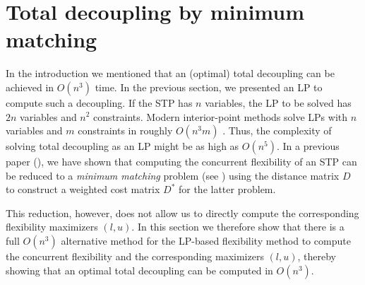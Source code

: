 \section{Total decoupling by minimum matching} \label{section:computing}

In the introduction we mentioned that an (optimal) total decoupling can be achieved in $O(n^3)$ time.
In the previous section, we presented an LP to compute such a decoupling. If the STP has $n$ variables, the LP to be solved has $2n$ variables and $n^2$ constraints. 
Modern interior-point methods solve LPs with $n$ variables and $m$ constraints in roughly $O(n^3 m)$ \cite{potra2000}.
Thus, the complexity of solving total decoupling as an LP might be as high as $O(n^5)$.
In a previous paper (\cite{mountakis:2015}), we have shown that computing the concurrent flexibility of an STP can be reduced to a  
\emph{minimum matching} problem (see \cite{papadimitriou:1982}) using the distance matrix $D$ to construct a weighted cost matrix $D^*$ for the latter problem. 

This reduction, however, does not allow us to directly compute the corresponding flexibility maximizers $(l,u)$.
In this section we therefore show that there is a full $O(n^3)$ alternative method for the LP-based flexibility method to compute the concurrent flexibility and the 
corresponding maximizers $(l,u)$, thereby showing that an optimal total decoupling can be computed in $O(n^3)$.

